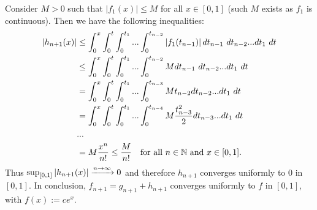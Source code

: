 \begin{problem}
\begin{solution}
Consider $M>0$ such that $\left|f_1(x)\right| \le M$ for all $x\in [0,1]$ (such $M$ exists as $f_1$ is continuous). Then we have the following inequalities:
\begin{align*}
    \left| h_{n+1}(x) \right| &\le \int_0^x \int_0^t \int_0^{t_1}...\int_0^{t_{n-2}} \left| f_1(t_{n-1}) \right| dt_{n-1}\ dt_{n-2} ... dt_1\ dt \\
    &\le \int_0^x \int_0^t \int_0^{t_1}...\int_0^{t_{n-2}} M dt_{n-1}\ dt_{n-2} ... dt_1\ dt \\
    &= \int_0^x \int_0^t \int_0^{t_1}...\int_0^{t_{n-3}} M t_{n-2} dt_{n-2} ... dt_1\ dt \\
    &= \int_0^x \int_0^t \int_0^{t_1}...\int_0^{t_{n-4}} 
    M\dfrac{t_{n-3}^2}{2}
    dt_{n-3} ... dt_1\ dt \\
    &...\\
    &= M \dfrac{x^n}{n!} \le \dfrac{M}{n!} \ \ \text{ for all } n\in \N \text{ and } x\in [0,1].
\end{align*}
Thus $\sup_{[0,1]}\left| h_{n+1}(x) \right| \xrightarrow{n \rightarrow \infty} 0$ and therefore $h_{n+1}$ converges uniformly to $0$ in $[0,1]$. In conclusion, $f_{n+1} = g_{n+1} + h_{n+1}$ converges uniformly to $f$ in $[0,1]$, with $f(x):= ce^x$.
\end{solution}
\end{problem}

